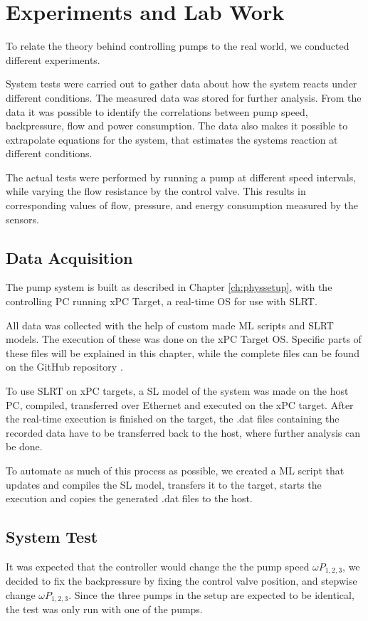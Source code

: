 \chapter{Experiments and Lab Work}\label{ch:experiment}
To relate the theory behind controlling pumps to the real world,
we conducted different experiments.

System tests were carried out to gather data about how the system reacts under different conditions.
The measured data was stored for further analysis.
From the data it was possible to identify the correlations between pump speed, 
backpressure, flow and power consumption. 
The data also makes it possible to extrapolate equations for the system,
that estimates the systems reaction at different conditions.

The actual tests were performed by running a pump at different speed intervals,
while varying the flow resistance by the control valve.
This results in corresponding values of flow, pressure, and energy consumption
measured by the sensors.

\section{Data Acquisition}\label{sec:data_gathering}
The pump system is built as described in Chapter \ref{ch:physsetup},
with the controlling PC running xPC Target,
a real-time OS for use with SLRT. 

All data was collected with the help of custom made 
ML scripts and SLRT models.
The execution of these was done on the xPC Target OS.
Specific parts of these files will be explained in this chapter,
while the complete files can be found on the GitHub repository \cite{GitHub}.

To use SLRT on xPC targets, a SL model of the system was made on the host PC,
compiled, transferred over Ethernet and executed on the xPC target.
After the real-time execution is finished on the target,
the .dat files containing the recorded data have to be transferred back to the host,
where further analysis can be done.

To automate as much of this process as possible,
we created a ML script that updates and compiles the SL model, transfers it to the target,
starts the execution and copies the generated .dat files to the host.

\section{System Test}\label{sec:system_test} 
It was expected that the controller would change the the pump speed $\omega P_{1,2,3}$,
we decided to fix the backpressure by fixing the control valve position,
and stepwise change $\omega P_{1,2,3}$.
Since the three pumps in the setup are expected to be identical,
the test was only run with one of the pumps.

